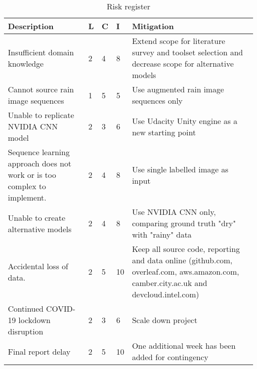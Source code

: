 

\begin{table}[h]
\begin{center}
\begin{tabular}{ |m{55mm}|m{3mm}|m{3mm}|m{5mm}|m{73mm}| } 
\hline
\textbf{Description} & \textbf{L} & \textbf{C} & \textbf{I} & \textbf{Mitigation} \\ \hline

Insufficient domain knowledge
& 2 & 4 & \cellcolor[HTML]{FFBF00} 8 &
Extend scope for literature survey and toolset selection and decrease scope for alternative models \\ \hline

Cannot source rain image sequences
& 1 & 5 & \cellcolor[HTML]{00FF00} 5 &
Use augmented rain image sequences only \\ \hline

Unable to replicate NVIDIA CNN model
& 2 & 3 & \cellcolor[HTML]{FFBF00} 6 &
Use Udacity Unity engine as a new starting point\\ \hline

Sequence learning approach does not work or is too complex to implement.
& 2 & 4 & \cellcolor[HTML]{FFBF00} 8 &
Use single labelled image as input \\ \hline

Unable to create alternative models
& 2 & 4 & \cellcolor[HTML]{FFBF00} 8 &
Use NVIDIA CNN only, comparing ground truth "dry" with "rainy" data \\ \hline

Accidental loss of data.
& 2 & 5 & \cellcolor[HTML]{FF0000} 10 &
Keep all source code, reporting and data online (github.com, overleaf.com, aws.amazon.com, camber.city.ac.uk and devcloud.intel.com) \\ \hline

Continued COVID-19 lockdown disruption
& 2 & 3 & \cellcolor[HTML]{FFBF00} 6 &
Scale down project \\ \hline

Final report delay 
& 2 & 5 & \cellcolor[HTML]{FF0000} 10 & 
One additional week has been added for contingency \\ \hline


\end{tabular}
\end{center}
\caption{Risk register}
\label{table:risk_table}
\end{table}